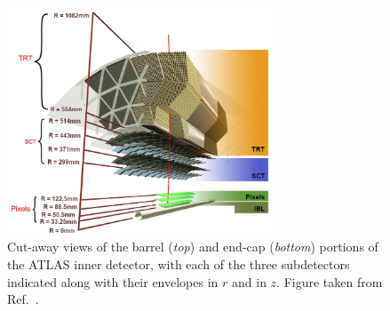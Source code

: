\begin{figure}[!htb]
    \begin{center}
        \includegraphics[width=0.7\textwidth]{figures/chapter2/inner_detector/atlas_ID_barrel_exploded}
        \caption{
            Cut-away views of the barrel (\textit{top}) and end-cap (\textit{bottom}) portions
            of the ATLAS inner detector, with each of the three subdetectors indicated along with their
            envelopes in $r$ and in $z$.
            Figure taken from Ref.~\cite{ATLASCollab}.
        }
        \label{fig:atlas_ID_exploded}
    \end{center}
\end{figure}

